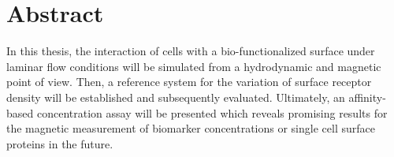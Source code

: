 
\chapter{Abstract}

In this thesis, the interaction of cells with a bio-functionalized surface under laminar flow conditions will be simulated from a hydrodynamic and magnetic point of view. Then, a reference system for the variation of surface receptor density will be established and subsequently evaluated. Ultimately, an affinity-based concentration assay will be presented which reveals promising results for the magnetic measurement of biomarker concentrations or single cell surface proteins in the future.
